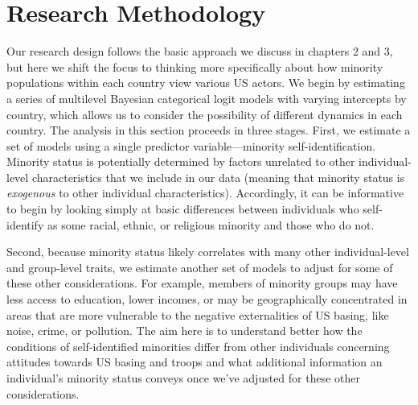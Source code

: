 \section*{Research Methodology}
Our research design follows the basic approach we discuss in chapters 2 and 3, but here we shift the focus to thinking more specifically about how minority populations within each country view various US actors. We begin by estimating a series of multilevel Bayesian categorical logit models with varying intercepts by country, which allows us to consider the possibility of different dynamics in each country. The analysis in this section proceeds in three stages. First, we estimate a set of models using a single predictor variable---minority self-identification. Minority status is potentially determined by factors unrelated to other individual-level characteristics that we include in our data (meaning that minority status is \textit{exogenous} to other individual characteristics). Accordingly, it can be informative to begin by looking simply at basic differences between individuals who self-identify as some racial, ethnic, or religious minority and those who do not. 

Second, because minority status likely correlates with many other individual-level and group-level traits, we estimate another set of models to adjust for some of these other considerations. For example, members of minority groups may have less access to education, lower incomes, or may be geographically concentrated in areas that are more vulnerable to the negative externalities of US basing, like noise, crime, or pollution. The aim here is to understand better how the conditions of self-identified minorities differ from other individuals concerning attitudes towards US basing and troops and what additional information an individual's minority status conveys once we've adjusted for these other considerations. 

